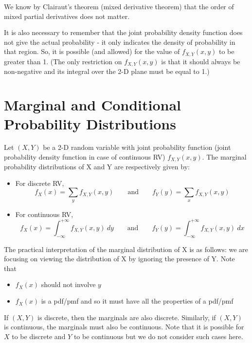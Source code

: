 We know by Clairaut's theorem (mixed derivative theorem) that the order of mixed partial derivatives does not matter.

It is also necessary to remember that the joint probability density function does not give the actual probability - it only indicates the density of probability in that region. So, it is possible (and allowed) for the value of $f_{X,Y}(x,y)$ to be greater than 1. (The only restriction on $f_{X,Y}(x,y)$ is that it should always be non-negative and its integral over the 2-D plane must be equal to 1.)

\section{Marginal and Conditional Probability Distributions}

\begin{definition}
Let $(X,Y)$ be a 2-D random variable with joint probability function (joint probability density function in case of continuous RV) $f_{X,Y}(x,y)$. The marginal probability distributions of X and Y are respectively given by:
\begin{itemize}
    \item For discrete RV,
    $$
    f_X(x) = \sum_y f_{X,Y}(x,y) \qquad \text{and} \qquad f_Y(y) = \sum_x f_{X,Y}(x,y)
    $$
    \item For continuous RV,
    $$
    f_X(x) = \int_{-\infty}^{+\infty} f_{X,Y}(x,y) \  dy \qquad \text{and} \qquad f_Y(y) = \int_{-\infty}^{+\infty} f_{X,Y}(x,y) \ dx
    $$
\end{itemize}
\end{definition}

\begin{note}
\end{note}
The practical interpretation of the marginal distribution of X is as follows: we are focusing on viewing the distribution of X by ignoring the presence of Y. Note that
\begin{itemize}
    \item $f_X(x)$ should not involve $y$
    \item $f_X(x)$ is a pdf/pmf and so it must have all the properties of a pdf/pmf
\end{itemize}

If $(X,Y)$ is discrete, then the marginals are also discrete. Similarly, if $(X,Y)$ is continuous, the marginals must also be continuous. Note that it is possible for $X$ to be discrete and $Y$ to be continuous but we do not consider such cases here.

